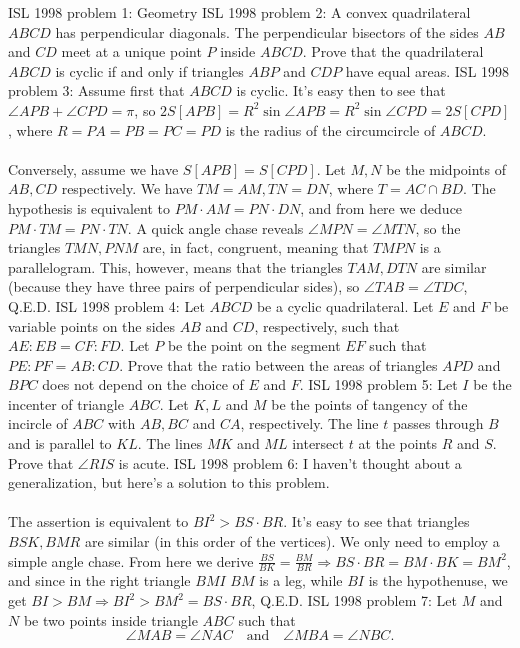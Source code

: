ISL 1998 problem 1:  Geometry 
ISL 1998 problem 2:  A convex quadrilateral $ABCD$ has perpendicular diagonals. The perpendicular bisectors of the sides $AB$ and $CD$ meet at a unique point $P$ inside $ABCD$. Prove that the quadrilateral $ABCD$ is cyclic if and only if triangles $ABP$ and $CDP$ have equal areas. 
ISL 1998 problem 3:  Assume first that $ABCD$ is cyclic. It's easy then to see that $\angle APB+\angle CPD=\pi$, so $2S[APB]=R^2\sin \angle APB=R^2\sin\angle CPD=2S[CPD]$, where $R=PA=PB=PC=PD$ is the radius of the circumcircle of $ABCD$. \\\\
Conversely, assume we have $S[APB]=S[CPD]$. Let $M,N$ be the midpoints of $AB,CD$ respectively. We have $TM=AM,TN=DN$, where $T=AC\cap BD$. The hypothesis is equivalent to $PM\cdot AM=PN\cdot DN$, and from here we deduce $PM\cdot TM=PN\cdot TN$. A quick angle chase reveals $\angle MPN=\angle MTN$, so the triangles $TMN,PNM$ are, in fact, congruent, meaning that $TMPN$ is a parallelogram. This, however, means that the triangles $TAM,DTN$ are similar (because they have three pairs of perpendicular sides), so $\angle TAB=\angle TDC$, Q.E.D. 
ISL 1998 problem 4:  Let $ABCD$ be a cyclic quadrilateral. Let $E$ and $F$ be variable points on the sides $AB$ and $CD$, respectively, such that $AE:EB=CF:FD$. Let $P$ be the point on the segment $EF$ such that $PE:PF=AB:CD$. Prove that the ratio between the areas of triangles $APD$ and $BPC$ does not depend on the choice of $E$ and $F$. 
ISL 1998 problem 5:  Let $I$ be the incenter of triangle $ABC$. Let $K,L$ and $M$ be the points of tangency of the incircle of $ABC$ with $AB,BC$ and $CA$, respectively. The line $t$ passes through $B$ and is parallel to $KL$. The lines $MK$ and $ML$ intersect $t$ at the points $R$ and $S$. Prove that $\angle RIS$ is acute. 
ISL 1998 problem 6:  I haven't thought about a generalization, but here's a solution to this problem. \\\\
The assertion is equivalent to $BI^2>BS\cdot BR$. It's easy to see that triangles $BSK,BMR$ are similar (in this order of the vertices). We only need to employ a simple angle chase. From here we derive $\frac{BS}{BK}=\frac{BM}{BR}\Rightarrow BS\cdot BR=BM\cdot BK=BM^2$, and since in the right triangle $BMI$ $BM$ is a leg, while $BI$ is the hypothenuse, we get $BI>BM\Rightarrow BI^2>BM^2=BS\cdot BR$, Q.E.D. 
ISL 1998 problem 7:  Let $ M$ and $ N$ be two points inside triangle $ ABC$ such that
\[ \angle MAB = \angle NAC\quad \mbox{and}\quad \angle MBA = \angle NBC. \]
